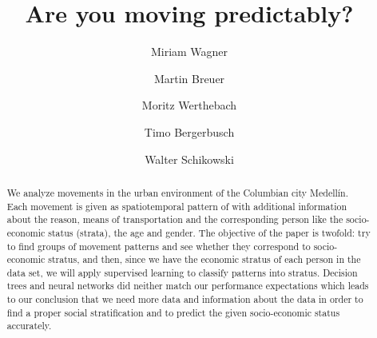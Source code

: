 \documentclass[runningheads]{llncs}
\begin{document}
	
	
	\title{Are you moving predictably?}
	\author{Miriam Wagner\and
		Martin Breuer\and
		Moritz Werthebach\and
		Timo Bergerbusch\and
		Walter Schikowski}
	\maketitle              %
	\begin{abstract} %
		We analyze movements in the urban environment of the Columbian city Medellín. Each movement is given as spatiotemporal pattern of with additional information about the reason, means of transportation and the corresponding person like the socio-economic status (strata), the age and gender. 
		The objective of the paper is twofold: try to find groups of movement patterns and see whether they correspond to socio-economic stratus, and then, since we have the economic stratus of each person in the data set, we will apply supervised learning to classify patterns into stratus.
		Decision trees and neural networks did neither match our performance expectations which leads to our conclusion that we need more data and information about the data in order to find a proper social stratification and to predict the given socio-economic status accurately.
		
	\end{abstract}
\end{document}

